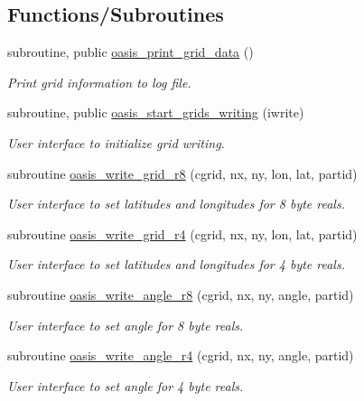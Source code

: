 \subsection*{Functions/\+Subroutines}
\begin{DoxyCompactItemize}
\item 
subroutine, public \hyperlink{namespacemod__oasis__grid_a4bc230ba4aa317f666bdab2416b4f6da}{oasis\+\_\+print\+\_\+grid\+\_\+data} ()
\begin{DoxyCompactList}\small\item\em Print grid information to log file. \end{DoxyCompactList}\item 
subroutine, public \hyperlink{namespacemod__oasis__grid_acb0569d8677f0762559ed6b211945d9b}{oasis\+\_\+start\+\_\+grids\+\_\+writing} (iwrite)
\begin{DoxyCompactList}\small\item\em User interface to initialize grid writing. \end{DoxyCompactList}\item 
subroutine \hyperlink{namespacemod__oasis__grid_a61a1b9209b5012b58fadf2a79284e1e7}{oasis\+\_\+write\+\_\+grid\+\_\+r8} (cgrid, nx, ny, lon, lat, partid)
\begin{DoxyCompactList}\small\item\em User interface to set latitudes and longitudes for 8 byte reals. \end{DoxyCompactList}\item 
subroutine \hyperlink{namespacemod__oasis__grid_a74137e0541f8a9e2b1f05918b7f8da17}{oasis\+\_\+write\+\_\+grid\+\_\+r4} (cgrid, nx, ny, lon, lat, partid)
\begin{DoxyCompactList}\small\item\em User interface to set latitudes and longitudes for 4 byte reals. \end{DoxyCompactList}\item 
subroutine \hyperlink{namespacemod__oasis__grid_a5ffeb1d150d305f2868114faf7ebddb2}{oasis\+\_\+write\+\_\+angle\+\_\+r8} (cgrid, nx, ny, angle, partid)
\begin{DoxyCompactList}\small\item\em User interface to set angle for 8 byte reals. \end{DoxyCompactList}\item 
subroutine \hyperlink{namespacemod__oasis__grid_aa4f44626552980d5418d77447e1ce058}{oasis\+\_\+write\+\_\+angle\+\_\+r4} (cgrid, nx, ny, angle, partid)
\begin{DoxyCompactList}\small\item\em User interface to set angle for 4 byte reals. \end{DoxyCompactList}\item 

\end{DoxyCompactItemize}
